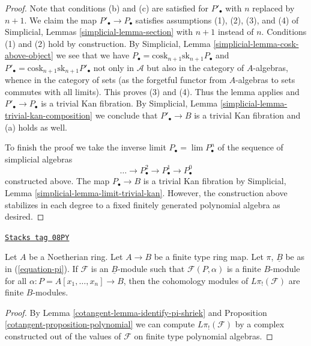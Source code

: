 \begin{proof}
\medskip\noindent
Note that conditions (b) and (c) are satisfied for $P'_\bullet$ with $n$
replaced by $n + 1$. We claim the map $P'_\bullet \to P_\bullet$ satisfies
assumptions (1), (2), (3), and (4) of
Simplicial, Lemmas \ref{simplicial-lemma-section}
with $n + 1$ instead of $n$. Conditions (1) and (2) hold by construction.
By Simplicial, Lemma \ref{simplicial-lemma-cosk-above-object}
we see that we have
$P_\bullet = \text{cosk}_{n + 1}\text{sk}_{n + 1}P_\bullet$
and
$P'_\bullet = \text{cosk}_{n + 1}\text{sk}_{n + 1}P'_\bullet$
not only in $\mathcal{A}$ but also in the category of $A$-algebras,
whence in the category of sets (as the forgetful functor from $A$-algebras
to sets commutes with all limits). This proves (3) and (4). Thus the lemma
applies and $P'_\bullet \to P_\bullet$ is a trivial Kan fibration. By
Simplicial, Lemma \ref{simplicial-lemma-trivial-kan-composition}
we conclude that $P'_\bullet \to B$ is a trivial Kan fibration and (a)
holds as well.

\medskip\noindent
To finish the proof we take the inverse limit $P_\bullet = \lim P^n_\bullet$
of the sequence of simplicial algebras
$$
\ldots \to P^2_\bullet \to P^1_\bullet \to P^0_\bullet
$$
constructed above. The map $P_\bullet \to B$ is a trivial Kan fibration by
Simplicial, Lemma \ref{simplicial-lemma-limit-trivial-kan}.
However, the construction above stabilizes in each degree
to a fixed finitely generated polynomial algebra as desired.
\end{proof}

\begin{lemma}
\label{cotangent-lemma-pi-shriek-finite}
\href{https://stacks.math.columbia.edu/tag/08PY}{\texttt{Stacks tag 08PY}}

Let $A$ be a Noetherian ring. Let $A \to B$ be a finite type ring map.
Let $\pi$, $\underline{B}$ be as in (\ref{equation-pi}).
If $\mathcal{F}$ is an $\underline{B}$-module such that
$\mathcal{F}(P, \alpha)$ is a finite $B$-module for all
$\alpha : P = A[x_1, \ldots, x_n] \to B$, then the cohomology modules
of $L\pi_!(\mathcal{F})$ are finite $B$-modules.
\end{lemma}

\begin{proof}

By Lemma \ref{cotangent-lemma-identify-pi-shriek} and
Proposition \ref{cotangent-proposition-polynomial}
we can compute $L\pi_!(\mathcal{F})$ by a complex
constructed out of the values of $\mathcal{F}$ on finite type
polynomial algebras.
\end{proof}

